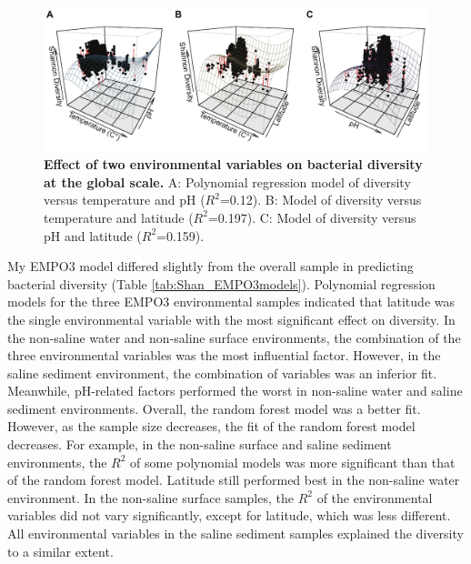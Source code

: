 \documentclass[11pt, a4paper]{article}
\begin{document}
\begin{spacing}{1.5}
\begin{figure}
    \centering
    \includegraphics[scale=0.8]{./Figures/Shan_PM_all_2EVs_3D}
    \caption{\textbf{Effect of two environmental variables on bacterial diversity at the global scale.} A: Polynomial regression model of diversity versus temperature and pH ($R^{2}$=0.12). B: Model of diversity versus temperature and latitude ($R^{2}$=0.197). C: Model of diversity versus pH and latitude ($R^{2}$=0.159).}
    \label{fig:Shan_PM_2EVs}
\end{figure}

My EMPO3 model differed slightly from the overall sample in predicting bacterial diversity (Table \ref{tab:Shan_EMPO3models}). Polynomial regression models for the three EMPO3 environmental samples indicated that latitude was the single environmental variable with the most significant effect on diversity. In the non-saline water and non-saline surface environments, the combination of the three environmental variables was the most influential factor. However, in the saline sediment environment, the combination of variables was an inferior fit. Meanwhile, pH-related factors performed the worst in non-saline water and saline sediment environments. Overall, the random forest model was a better fit. However, as the sample size decreases, the fit of the random forest model decreases. For example, in the non-saline surface and saline sediment environments, the $R^{2}$ of some polynomial models was more significant than that of the random forest model. Latitude still performed best in the non-saline water environment. In the non-saline surface samples, the $R^{2}$ of the environmental variables did not vary significantly, except for latitude, which was less different. All environmental variables in the saline sediment samples explained the diversity to a similar extent.


\end{spacing}
\end{document}
